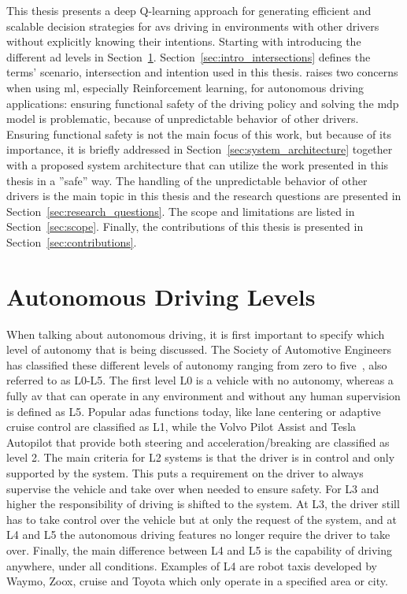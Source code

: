 This thesis presents a deep Q-learning approach for generating efficient and scalable decision strategies for \gls{av}s driving in environments with other drivers without explicitly knowing their intentions. 
Starting with introducing the different \gls{ad} levels in Section~\ref{sec:intro_ad}.
Section~\ref{sec:intro_intersections} defines the terms' scenario, intersection and intention used in this thesis.
 raises two concerns when using \gls{ml}, especially Reinforcement learning, for autonomous driving applications: ensuring functional safety of the driving policy and solving the \gls{mdp} model is problematic, because of unpredictable behavior of other drivers. 
Ensuring functional safety is not the main focus of this work, but because of its importance, it is briefly addressed in Section~\ref{sec:system_architecture} together with a proposed system architecture that can utilize the work presented in this thesis in a ''safe'' way. 
The handling of the unpredictable behavior of other drivers is the main topic in this thesis and the research questions are presented in Section~\ref{sec:research_questions}. The scope and limitations are listed in Section~\ref{sec:scope}. Finally, the contributions of this thesis is presented in Section~\ref{sec:contributions}. 

\section{Autonomous Driving Levels}
\label{sec:intro_ad}
When talking about autonomous driving, it is first important to specify which level of autonomy that is being discussed. The Society of Automotive Engineers has classified these different levels of autonomy ranging from zero to five~\cite{SAE2021}, also referred to as L0-L5. The first level L0 is a vehicle with no autonomy, whereas a fully \gls{av} that can operate in any environment and without any human supervision is defined as L5. Popular \gls{adas} functions today, like lane centering or adaptive cruise control are classified as L1, while the Volvo Pilot Assist and Tesla Autopilot that provide both steering and acceleration/breaking are classified as level 2. The main criteria for L2 systems is that the driver is in control and only supported by the system. This puts a requirement on the driver to always supervise the vehicle and take over when needed to ensure safety. For L3 and higher the responsibility of driving is shifted to the system. At L3, the driver still has to take control over the vehicle but at only the request of the system, and at L4 and L5 the autonomous driving features no longer require the driver to take over. Finally, the main difference between L4 and L5 is the capability of driving anywhere, under all conditions. Examples of L4 are robot taxis developed by Waymo, Zoox, cruise and Toyota which only operate in a specified area or city. 

